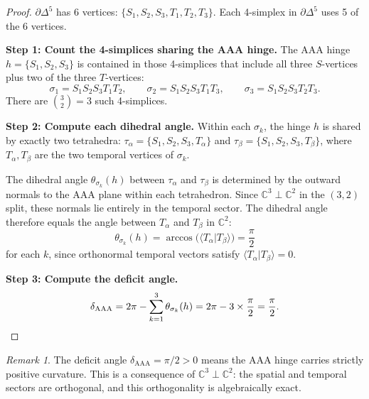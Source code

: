 \documentclass[12pt]{article}
\theoremstyle{remark}
\newtheorem{remark}[theorem]{Remark}
\begin{document}
\begin{proof}
$\partial\Delta^5$ has 6 vertices: $\{S_1, S_2, S_3, T_1, T_2, T_3\}$.
Each 4-simplex in $\partial\Delta^5$ uses 5 of the 6 vertices.

\medskip\noindent
\textbf{Step 1: Count the 4-simplices sharing the AAA hinge.}
The AAA hinge $h = \{S_1, S_2, S_3\}$ is contained in those 4-simplices
that include all three $S$-vertices plus two of the three $T$-vertices:
\begin{equation}
\sigma_1 = S_1 S_2 S_3 T_1 T_2, \qquad
\sigma_2 = S_1 S_2 S_3 T_1 T_3, \qquad
\sigma_3 = S_1 S_2 S_3 T_2 T_3.
\end{equation}
There are $\binom{3}{2} = 3$ such 4-simplices.

\medskip\noindent
\textbf{Step 2: Compute each dihedral angle.}
Within each $\sigma_k$, the hinge $h$ is shared by exactly two
tetrahedra: $\tau_\alpha = \{S_1, S_2, S_3, T_\alpha\}$ and
$\tau_\beta = \{S_1, S_2, S_3, T_\beta\}$, where $T_\alpha, T_\beta$
are the two temporal vertices of $\sigma_k$.

The dihedral angle $\theta_{\sigma_k}(h)$ between $\tau_\alpha$ and
$\tau_\beta$ is determined by the outward normals to the AAA plane
within each tetrahedron. Since $\mathbb{C}^3 \perp \mathbb{C}^2$ in
the $(3,2)$ split, these normals lie entirely in the temporal sector.
The dihedral angle therefore equals the angle between $T_\alpha$ and
$T_\beta$ in $\mathbb{C}^2$:
\begin{equation}
\theta_{\sigma_k}(h) =
\arccos\bigl(\langle T_\alpha | T_\beta \rangle\bigr) = \frac{\pi}{2}
\end{equation}
for each $k$, since orthonormal temporal vectors satisfy
$\langle T_\alpha | T_\beta \rangle = 0$.

\medskip\noindent
\textbf{Step 3: Compute the deficit angle.}
\begin{equation}
\delta_{\mathrm{AAA}} = 2\pi - \sum_{k=1}^{3} \theta_{\sigma_k}(h)
= 2\pi - 3 \times \frac{\pi}{2} = \frac{\pi}{2}. \qedhere
\end{equation}
\end{proof}

\begin{remark}
The deficit angle $\delta_{\mathrm{AAA}} = \pi/2 > 0$ means the AAA
hinge carries strictly positive curvature. This is a consequence of
$\mathbb{C}^3 \perp \mathbb{C}^2$: the spatial and temporal sectors
are orthogonal, and this orthogonality is algebraically exact.
\end{remark}
\end{document}
